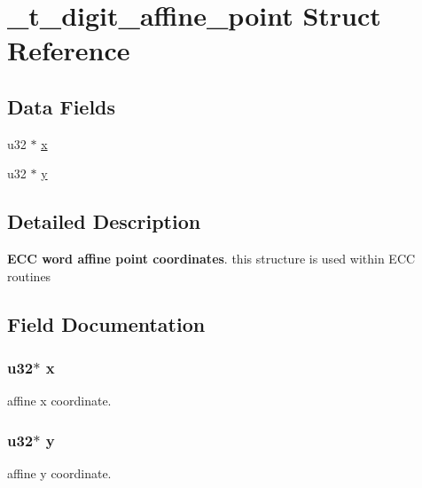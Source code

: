 \hypertarget{struct__t__digit__affine__point}{\section{\+\_\+t\+\_\+digit\+\_\+affine\+\_\+point Struct Reference}
\label{struct__t__digit__affine__point}
}
\subsection*{Data Fields}
\begin{DoxyCompactItemize}
\item 
u32 $\ast$ \hyperlink{struct__t__digit__affine__point_afb22ef172fe0d1819b8a567bc4f9d0a8}{x}
\item 
u32 $\ast$ \hyperlink{struct__t__digit__affine__point_a7c48a39466ef1e0a5be106b297e920b5}{y}
\end{DoxyCompactItemize}


\subsection{Detailed Description}
{\bfseries E\+C\+C word affine point coordinates}. this structure is used within E\+C\+C routines 

\subsection{Field Documentation}
\hypertarget{struct__t__digit__affine__point_afb22ef172fe0d1819b8a567bc4f9d0a8}{
\subsubsection[{x}]{\setlength{\rightskip}{0pt plus 5cm}u32$\ast$ x}}\label{struct__t__digit__affine__point_afb22ef172fe0d1819b8a567bc4f9d0a8}
affine x coordinate. \hypertarget{struct__t__digit__affine__point_a7c48a39466ef1e0a5be106b297e920b5}{
\subsubsection[{y}]{\setlength{\rightskip}{0pt plus 5cm}u32$\ast$ y}}\label{struct__t__digit__affine__point_a7c48a39466ef1e0a5be106b297e920b5}
affine y coordinate. 